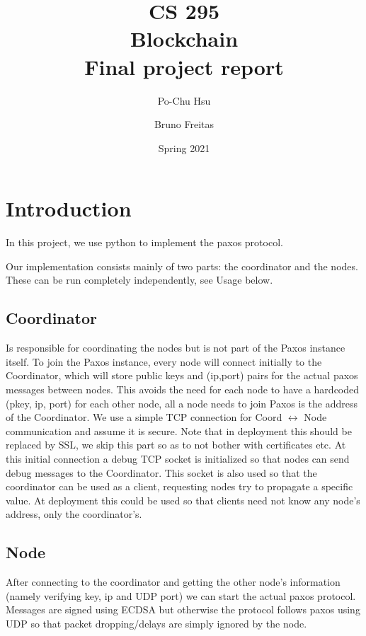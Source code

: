 \documentclass[12pt]{article}
\begin{document}
\title{CS 295 \\ Blockchain \\ Final project report}
\author{Po-Chu Hsu \and Bruno Freitas}
\date{Spring 2021}
\maketitle

\section{Introduction}

In this project, we use python to implement the paxos protocol.

Our implementation consists mainly of two parts: the coordinator and the nodes. These can be run completely independently, see Usage below.

\subsection{Coordinator}

Is responsible for coordinating the nodes but is not part of the Paxos instance itself. To join the Paxos instance, every node will connect initially to the Coordinator, which will store public keys and (ip,port) pairs for the actual paxos messages between nodes. This avoids the need for each node to have a hardcoded (pkey, ip, port) for each other node, all a node needs to join Paxos is the address of the Coordinator. We use a simple TCP connection for Coord $\leftrightarrow$ Node communication and assume it is secure. Note that in deployment this should be replaced by SSL, we skip this part so as to not bother with certificates etc. At this initial connection a debug TCP socket is initialized so that nodes can send debug messages to the Coordinator. This socket is also used so that the coordinator can be used as a client, requesting nodes try to propagate a specific value. At deployment this could be used so that clients need not know any node's address, only the coordinator's.

\subsection{Node}

After connecting to the coordinator and getting the other node's information (namely verifying key, ip and UDP port) we can start the actual paxos protocol. Messages are signed using ECDSA but otherwise the protocol follows paxos using UDP so that packet dropping/delays are simply ignored by the node.
\end{document}
